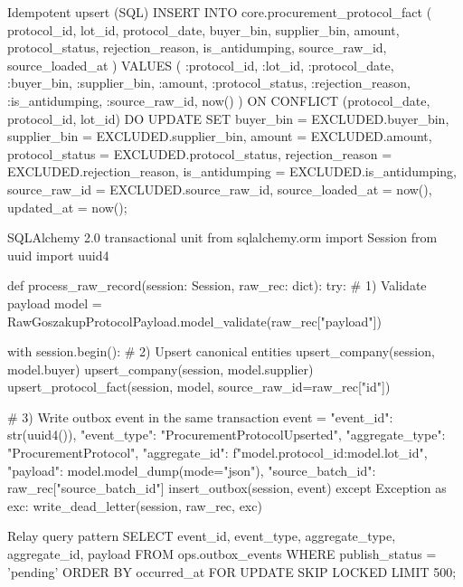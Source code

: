 \documentclass[11pt,a4paper]{article}
\begin{document}
\begin{codeblock}[language=SQL]{Idempotent upsert (SQL)}
INSERT INTO core.procurement_protocol_fact (
    protocol_id, lot_id, protocol_date, buyer_bin, supplier_bin,
    amount, protocol_status, rejection_reason, is_antidumping,
    source_raw_id, source_loaded_at
)
VALUES (
    :protocol_id, :lot_id, :protocol_date, :buyer_bin, :supplier_bin,
    :amount, :protocol_status, :rejection_reason, :is_antidumping,
    :source_raw_id, now()
)
ON CONFLICT (protocol_date, protocol_id, lot_id)
DO UPDATE SET
    buyer_bin = EXCLUDED.buyer_bin,
    supplier_bin = EXCLUDED.supplier_bin,
    amount = EXCLUDED.amount,
    protocol_status = EXCLUDED.protocol_status,
    rejection_reason = EXCLUDED.rejection_reason,
    is_antidumping = EXCLUDED.is_antidumping,
    source_raw_id = EXCLUDED.source_raw_id,
    source_loaded_at = now(),
    updated_at = now();
\end{codeblock}

\begin{codeblock}[language=Python]{SQLAlchemy 2.0 transactional unit}
from sqlalchemy.orm import Session
from uuid import uuid4

def process_raw_record(session: Session, raw_rec: dict):
    try:
        # 1) Validate payload
        model = RawGoszakupProtocolPayload.model_validate(raw_rec["payload"])

        with session.begin():
            # 2) Upsert canonical entities
            upsert_company(session, model.buyer)
            upsert_company(session, model.supplier)
            upsert_protocol_fact(session, model, source_raw_id=raw_rec["id"])

            # 3) Write outbox event in the same transaction
            event = {
                "event_id": str(uuid4()),
                "event_type": "ProcurementProtocolUpserted",
                "aggregate_type": "ProcurementProtocol",
                "aggregate_id": f"{model.protocol_id}:{model.lot_id}",
                "payload": model.model_dump(mode="json"),
                "source_batch_id": raw_rec["source_batch_id"]
            }
            insert_outbox(session, event)
    except Exception as exc:
        write_dead_letter(session, raw_rec, exc)
\end{codeblock}

\begin{codeblock}[language=SQL]{Relay query pattern}
SELECT event_id, event_type, aggregate_type, aggregate_id, payload
FROM ops.outbox_events
WHERE publish_status = 'pending'
ORDER BY occurred_at
FOR UPDATE SKIP LOCKED
LIMIT 500;
\end{codeblock}
\end{document}
